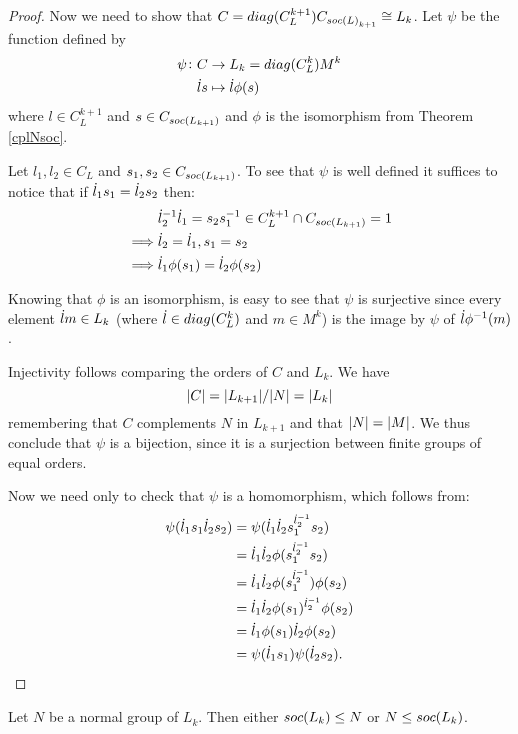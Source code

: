\begin{proof}
    Now we need to show that $C = diag({C_L^{k+1}})C_{soc {(L)}_{k+1}} \cong L_k$. Let $\psi$ be the function defined by
    \begin{align*}
        \psi \colon C & \rightarrow L_k=diag({C_L^k})M^k \\
                    \dot{l} s &\mapsto \dot{l} \phi(s)
    \end{align*}
    where $l \in C_L^{k+1}$ and $s \in C_{soc {(L_{k+1})}}$ and $\phi$ is the isomorphism from Theorem \ref{cplNsoc}.

    Let $l_1, l_2 \in C_L$ and $s_1, s_2 \in C_{soc {(L_{k+1})}}$.
    To see that $\psi$ is well defined it suffices to notice that if $\dot{l}_1s_1 = \dot{l}_2s_2$ then:
    \begin{align*}
        &\dot{l}_2^{-1}\dot{l}_1 = s_2s_1^{-1} \in C_L^{k+1} \cap C_{soc {(L_{k+1})}} = 1 \\
        \implies & \dot{l}_2 = \dot{l}_1, s_1 = s_2 \\
        \implies & \dot{l}_1\phi(s_1) = \dot{l}_2\phi(s_2)
    \end{align*}

    Knowing that $\phi$ is an isomorphism, is easy to see that $\psi$ is surjective since every element $\dot{l} m \in L_k$ (where $\dot{l} \in diag({C_L^k})$ and $m \in M^k$) is the image by $\psi$ of $\dot{l}\phi^{-1}(m)$.

    Injectivity follows comparing the orders of $C$ and $L_k$. We have
    $$
    | C | = | L_{k+1} | / | N | = | L_k |
    $$
    remembering that $C$ complements $N$ in $L_{k+1}$ and that $| N | = | M |$.
    We thus conclude that $\psi$ is a bijection, since it is a surjection between finite groups of equal orders.

    Now we need only to check that $\psi$ is a homomorphism, which follows from:
    \begin{align*}
        \psi(\dot{l}_1s_1\dot{l}_2s_2) &= 
    \psi(\dot{l}_1\dot{l}_2s_1^{\dot{l}_2^{-1}}s_2)\\
    &= \dot{l}_1\dot{l}_2\phi(s_1^{\dot{l}_2^{-1}}s_2)\\
    &=\dot{l}_1\dot{l}_2\phi(s_1^{\dot{l}_2^{-1}})\phi(s_2)\\
    &=\dot{l}_1\dot{l}_2\phi(s_1)^{\dot{l}_2^{-1}}\phi(s_2)\\
    &=\dot{l}_1\phi(s_1)\dot{l}_2\phi(s_2)\\
    &= \psi(\dot{l}_1s_1)\psi(\dot{l}_2s_2).
    \end{align*}
\end{proof}

\begin{theorem}
    \label{th:nsubsoc}
    Let $N$ be a normal group of $L_k$. Then either $soc {(L_k)} \le N$ or $N \le soc {(L_k)}$.
\end{theorem}

